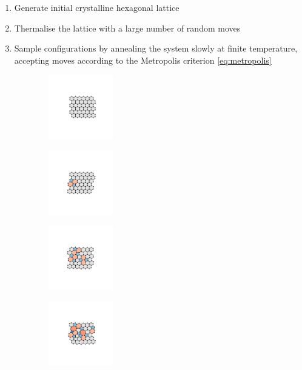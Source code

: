 \begin{enumerate}
	\item Generate initial crystalline hexagonal lattice
	\item Thermalise the lattice with a large number of random moves 
	\item Sample configurations by annealing the system slowly at finite temperature, accepting moves according to the Metropolis criterion \eqref{eq:metropolis}
\end{enumerate}
\begin{figure}[bt]
     \centering
     
     \begin{subfigure}[b]{0.24\textwidth}
    \centering
         \includegraphics[height=2.8cm]{./figures/methods/bs_0.pdf}
         \caption{}
         \label{fig:bsmc1}
     \end{subfigure}
     \hfill
     \begin{subfigure}[b]{0.24\textwidth}
    \centering
         \includegraphics[height=2.8cm]{./figures/methods/bs_1.pdf}
         \caption{}
         \label{fig:bsmc2}
     \end{subfigure}
     \hfill
     \begin{subfigure}[b]{0.24\textwidth}
    \centering
         \includegraphics[height=2.8cm]{./figures/methods/bs_3.pdf}
         \caption{}
         \label{fig:bsmc3}
     \end{subfigure}
     \hfill
     \begin{subfigure}[b]{0.24\textwidth}
    \centering
         \includegraphics[height=2.8cm]{./figures/methods/bs_5.pdf}
         \caption{}
         \label{fig:bsmc4}
     \end{subfigure}
     

\end{figure}

